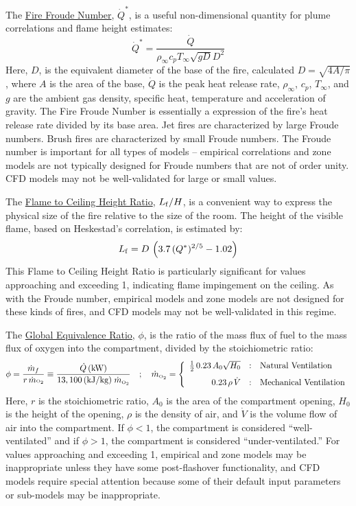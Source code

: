 \documentclass[fleqn,b5paper]{article}
\begin{document}
The \underline{Fire Froude Number}, $\dot{Q}^*$, is a useful non-dimensional quantity for plume correlations and flame height estimates:
\begin{equation} 
   \dot{Q}^* = \frac{\dot{Q}}{\rho_\infty c_p T_\infty \sqrt{gD} D^2} 
\end{equation}
Here, $D$, is the equivalent diameter of the base of the fire, calculated $D=\sqrt{4A/\pi}$, where $A$ is the area of the base, $\dot{Q}$ is the peak heat release rate, $\rho_\infty$, $c_p$, $T_\infty$, and $g$ are the ambient gas density, specific heat, temperature and acceleration of gravity. The Fire Froude Number is essentially a expression of the fire's heat release rate divided by its base area. Jet fires are characterized by large Froude numbers. Brush fires are characterized by small Froude numbers. The Froude number is important for all types of models -- empirical correlations and zone models are not typically designed for Froude numbers that are not of order unity. CFD models may not be well-validated for large or small values.

The \underline{Flame to Ceiling Height Ratio}, $L_{\rm f}/H$, is a convenient way to express the physical size of the fire relative to the size of the room. The height of the visible flame, based on Heskestad's correlation, is estimated by:
\begin{equation} 
   L_{\rm f} = D \, \left( 3.7 \, (Q^*)^{2/5} - 1.02 \right) 
\end{equation}
This Flame to Ceiling Height Ratio is particularly significant for values approaching and exceeding 1, indicating flame impingement on the ceiling. As with the Froude number, empirical models and zone models are not designed for these kinds of fires, and CFD models may not be well-validated in this regime.

The \underline{Global Equivalence Ratio}, $\phi$, is the ratio of the mass flux of fuel to the mass flux of oxygen into the compartment, divided by the stoichiometric ratio:
\begin{equation} \phi = \frac{\dot{m}_f}{r\, \dot{m}{\hbox{\tiny O$_2$}}} \equiv  \frac{\dot{Q} \, \hbox{(kW)}}{13,100 \, \hbox{(kJ/kg)} \; \dot{m}_{\hbox{\tiny O$_2$}} } \quad ; \quad  \dot{m}_{\hbox{\tiny O$_2$}} = \left\{
   \begin{array}{r@{\quad:\quad}l}
      \frac{1}{2} \, 0.23 \, A_0 \sqrt{H_0} & \hbox{Natural Ventilation} \\[0.1in]
      0.23 \, \rho \, \dot{V}       & \hbox{Mechanical Ventilation} \end{array} \right.
\end{equation}
Here, $r$ is the stoichiometric ratio, $A_0$ is the area of the compartment opening, $H_0$ is the height of the opening, $\rho$ is the density of air, and $\dot{V}$ is the volume flow of air into the compartment. If $\phi<1$, the compartment is considered ``well-ventilated'' and if $\phi>1$, the compartment is considered ``under-ventilated.'' For values approaching and exceeding 1, empirical and zone models may be inappropriate unless they have some post-flashover functionality, and CFD models require special attention because some of their default input parameters or sub-models may be inappropriate.
\end{document}

